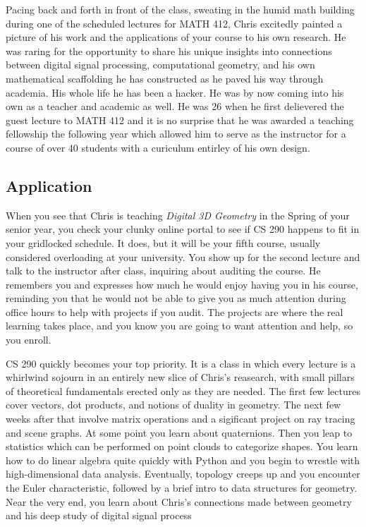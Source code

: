 \documentclass[../main.tex]{subfiles}
\begin{document}
 Pacing back and forth in front of the class, sweating in the humid math building during one of the scheduled lectures for MATH 412, Chris excitedly painted a picture of his work and the applications of your course to his own research. He was raring for the opportunity to share his unique insights into connections between digital signal processing, computational geometry, and his own mathematical scaffolding he has constructed as he paved his way through academia. His whole life he has been a hacker. He was by now coming into his own as a teacher and academic as well. He was 26 when he first delievered the guest lecture to MATH 412 and it is no surprise that he was awarded a teaching fellowship the following year which allowed him to serve as the instructor for a course of over 40 students with a curiculum entirley of his own design.

\subsection{Application} 
 
When you see that Chris is teaching \textit{Digital 3D Geometry} in the Spring of your senior year, you check your clunky online portal to see if CS 290 happens to fit in your gridlocked schedule. It does, but it will be your fifth course, usually considered overloading at your university. You show up for the second lecture and talk to the instructor after class, inquiring about auditing the course. He remembers you and expresses how much he would enjoy having you in his course, reminding you that he would not be able to give you as much attention during office hours to help with projects if you audit. The projects are where the real learning takes place, and you know you are going to want attention and help, so you enroll.

CS 290 quickly becomes your top priority. It is a class in which every lecture is a whirlwind sojourn in an entirely new slice of Chris's reasearch, with small pillars of theoretical fundamentals erected only as they are needed. The first few lectures cover vectors, dot products, and notions of duality in geometry. The next few weeks after that involve matrix operations and a sigificant project on ray tracing and scene graphs. At some point you learn about quaternions. Then you leap to statistics which can be performed on point clouds to categorize shapes. You learn how to do linear algebra quite quickly with Python and you begin to wrestle with high-dimensional data analysis. Eventually, topology creeps up and you encounter the Euler characteristic, followed by a brief intro to data structures for geometry. Near the very end, you learn about Chris's connections made between geometry and his deep study of digital signal process
 
\end{document}
